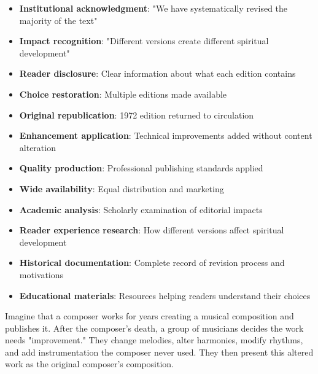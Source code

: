 \documentclass[12pt,twoside]{book}
\begin{document}
\begin{itemize}
\item \textbf{\textbf{Institutional acknowledgment}}: "We have systematically revised the majority of the text"
\item \textbf{\textbf{Impact recognition}}: "Different versions create different spiritual development"
\item \textbf{\textbf{Reader disclosure}}: Clear information about what each edition contains
\item \textbf{\textbf{Choice restoration}}: Multiple editions made available

\item \textbf{\textbf{Original republication}}: 1972 edition returned to circulation
\item \textbf{\textbf{Enhancement application}}: Technical improvements added without content alteration
\item \textbf{\textbf{Quality production}}: Professional publishing standards applied
\item \textbf{\textbf{Wide availability}}: Equal distribution and marketing

\item \textbf{\textbf{Academic analysis}}: Scholarly examination of editorial impacts
\item \textbf{\textbf{Reader experience research}}: How different versions affect spiritual development
\item \textbf{\textbf{Historical documentation}}: Complete record of revision process and motivations
\item \textbf{\textbf{Educational materials}}: Resources helping readers understand their choices
\end{itemize}

Imagine that a composer works for years creating a musical composition and publishes it. After the composer's death, a group of musicians decides the work needs "improvement." They change melodies, alter harmonies, modify rhythms, and add instrumentation the composer never used. They then present this altered work as the original composer's composition.
\end{document}
